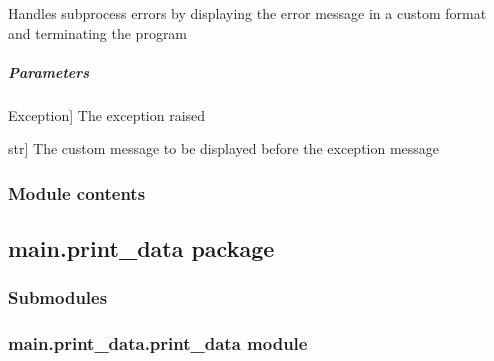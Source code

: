 \documentclass[letterpaper,10pt,english]{sphinxmanual}
\begin{document}
\begin{fulllineitems}
\begin{fulllineitems}
\label{\detokenize{main.error_handler:main.error_handler.error_handler.ErrorHandler.handle_subprocess_error}}
\pysigstartsignatures
{}
\pysigstopsignatures
\sphinxAtStartPar
Handles subprocess errors by displaying the error message in a custom format and terminating the program


\subparagraph{Parameters}
\label{\detokenize{main.error_handler:id2}}\begin{description}
\sphinxlineitem{e}{[}Exception{]}
\sphinxAtStartPar
The exception raised

\sphinxlineitem{custom\_message}{[}str{]}
\sphinxAtStartPar
The custom message to be displayed before the exception message

\end{description}

\end{fulllineitems}


\end{fulllineitems}



\subsubsection{Module contents}
\label{\detokenize{main.error_handler:module-main.error_handler}}\label{\detokenize{main.error_handler:module-contents}}
\sphinxstepscope


\subsection{main.print\_data package}
\label{\detokenize{main.print_data:main-print-data-package}}\label{\detokenize{main.print_data::doc}}

\subsubsection{Submodules}
\label{\detokenize{main.print_data:submodules}}

\subsubsection{main.print\_data.print\_data module}
\label{\detokenize{main.print_data:module-main.print_data.print_data}}\label{\detokenize{main.print_data:main-print-data-print-data-module}}
\end{document}
